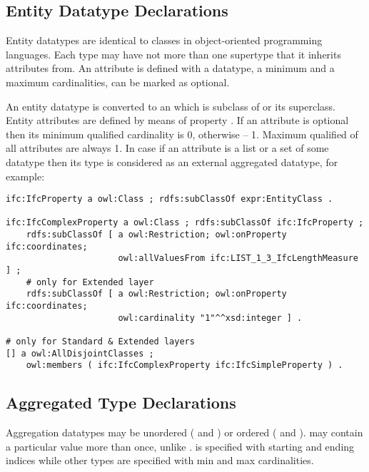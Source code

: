 \subsection{Entity Datatype Declarations}
\label{subsec:ifcOWL-entity-types}

Entity data\-types are identical to classes in object-oriented programming languages. Each type may have not more than one super\-type that it inherits attributes from. An attribute is defined with a data\-type, a minimum and a maximum cardinalities, can be marked as optional.

\begin{principle}An entity data\-type is converted to an  which is subclass of  or its superclass. Entity attributes are defined by means of property . If an attribute is optional then its minimum qualified cardinality is 0, otherwise -- 1. Maximum qualified of all attributes are always 1. In case if an attribute is a list or a set of some data\-type then its type is considered as an external aggregated data\-type, for example:
\begin{lstlisting}
ifc:IfcProperty a owl:Class ; rdfs:subClassOf expr:EntityClass .

ifc:IfcComplexProperty a owl:Class ; rdfs:subClassOf ifc:IfcProperty ;
    rdfs:subClassOf [ a owl:Restriction; owl:onProperty ifc:coordinates;
                      owl:allValuesFrom ifc:LIST_1_3_IfcLengthMeasure ] ;
    # only for Extended layer
    rdfs:subClassOf [ a owl:Restriction; owl:onProperty ifc:coordinates;
                      owl:cardinality "1"^^xsd:integer ] .

# only for Standard & Extended layers
[] a owl:AllDisjointClasses ;
    owl:members ( ifc:IfcComplexProperty ifc:IfcSimpleProperty ) .
\end{lstlisting}
\end{principle}


\subsection{Aggregated Type Declarations}
\label{subsec:ifcOWL-aggregated-types}

Aggregation data\-types may be unordered ( and ) or  ordered ( and ).  may contain a particular value more than once, unlike .  is specified with starting and ending indices while other types are specified with min and max cardinalities.

